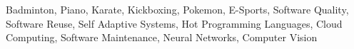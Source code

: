

\begin{cvparagraph}
Badminton, Piano, Karate, Kickboxing, Pokemon, E-Sports, Software Quality, Software Reuse, Self Adaptive Systems, Hot Programming Languages, Cloud Computing, Software Maintenance, Neural Networks, Computer Vision

\end{cvparagraph}
